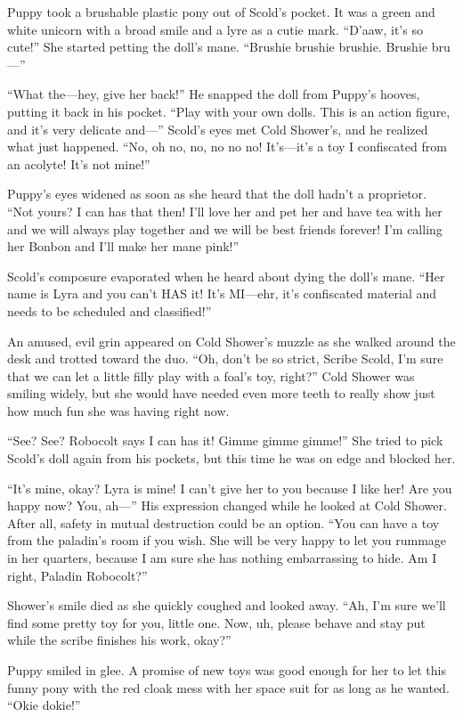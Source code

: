 Puppy took a brushable plastic pony out of Scold's pocket. It was a green and white unicorn with a broad smile and a lyre as a cutie mark. ``D'aaw, it's so cute!'' She started petting the doll's mane. ``Brushie brushie brushie. Brushie bru---''

``What the---hey, give her back!'' He snapped the doll from Puppy's hooves, putting it back in his pocket. ``Play with your own dolls. This is an action figure, and it's very delicate and---'' Scold's eyes met Cold Shower's, and he realized what just happened. ``No, oh no, no, no no no! It's---it's a toy I confiscated from an acolyte! It's not mine!''

Puppy's eyes widened as soon as she heard that the doll hadn't a proprietor. ``Not yours? I can has that then! I'll love her and pet her and have tea with her and we will always play together and we will be best friends forever! I'm calling her Bonbon and I'll make her mane pink!''

Scold's composure evaporated when he heard about dying the doll's mane. ``Her name is Lyra and you can't HAS it! It's MI---ehr, it's confiscated material and needs to be scheduled and classified!''

An amused, evil grin appeared on Cold Shower's muzzle as she walked around the desk and trotted toward the duo. ``Oh, don't be so strict, Scribe Scold, I'm sure that we can let a little filly play with a foal's toy, right?'' Cold Shower was smiling widely, but she would have needed even more teeth to really show just how much fun she was having right now.

``See? See? Robocolt says I can has it! Gimme gimme gimme!'' She tried to pick Scold's doll again from his pockets, but this time he was on edge and blocked her.

``It's mine, okay? Lyra is mine! I can't give her to you because I like her! Are you happy now? You, ah---'' His expression changed while he looked at Cold Shower. After all, safety in mutual destruction could be an option. ``You can have a toy from the paladin's room if you wish. She will be very happy to let you rummage in her quarters, because I am sure she has nothing embarrassing to hide. Am I right, Paladin Robocolt?''

Shower's smile died as she quickly coughed and looked away. ``Ah, I'm sure we'll find some pretty toy for you, little one. Now, uh, please behave and stay put while the scribe finishes his work, okay?''

Puppy smiled in glee. A promise of new toys was good enough for her to let this funny pony with the red cloak mess with her space suit for as long as he wanted. ``Okie dokie!''

